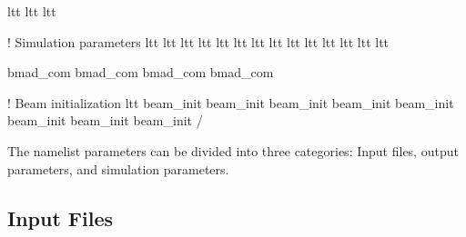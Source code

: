 \documentclass{hitec}
\begin{document}
{{{{{{{{{{{{{{{{{{\begin{code}
  ltt%
  ltt%
  ltt%

  ! Simulation parameters
  ltt%
  ltt%
  ltt%
  ltt%
  ltt%
  ltt%
  ltt%
  ltt%
  ltt%
  ltt%
  ltt%
  ltt%
  ltt%
  ltt%

  bmad_com%
  bmad_com%
  bmad_com%
  bmad_com%

  ! Beam initialization
  ltt%
  beam_init%
  beam_init%
  beam_init%
  beam_init%
  beam_init%
  beam_init%
  beam_init%
  beam_init%
/
\end{code}

\newpage

The namelist parameters can be divided into three categories: Input files, output parameters, and
simulation parameters.

\subsection{Input Files}

}}}}}}}}}}}}}}}}}}
\end{document}
